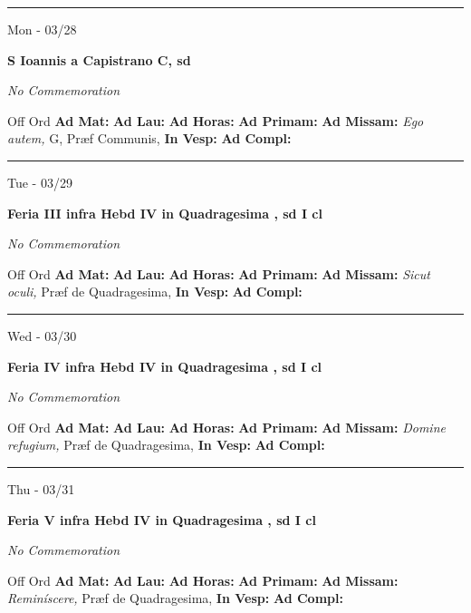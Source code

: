 \documentclass[letterpaper, 10pt]{article}
\begin{document}
\hrule
\begin{center}
Mon - 03/28
\end{center}\textbf{ \large S Ioannis a Capistrano C, \textnormal{\normalsize sd}}

\textit{No Commemoration}\begin{justify}
Off Ord
\textbf{Ad Mat: }
\textbf{Ad Lau: }
\textbf{Ad Horas: }
\textbf{Ad Primam: }
\textbf{Ad Missam:} \textit{Ego autem, } G, Præf Communis, 
\textbf{In Vesp: }
\textbf{Ad Compl: }\end{justify}



\hrule
\begin{center}
Tue - 03/29
\end{center}\textbf{ \large Feria III infra Hebd IV in Quadragesima , \textnormal{\normalsize sd I cl}}

\textit{No Commemoration}\begin{justify}
Off Ord
\textbf{Ad Mat: }
\textbf{Ad Lau: }
\textbf{Ad Horas: }
\textbf{Ad Primam: }
\textbf{Ad Missam:} \textit{Sicut oculi, } Præf de Quadragesima, 
\textbf{In Vesp: }
\textbf{Ad Compl: }\end{justify}



\hrule
\begin{center}
Wed - 03/30
\end{center}\textbf{ \large Feria IV infra Hebd IV in Quadragesima , \textnormal{\normalsize sd I cl}}

\textit{No Commemoration}\begin{justify}
Off Ord
\textbf{Ad Mat: }
\textbf{Ad Lau: }
\textbf{Ad Horas: }
\textbf{Ad Primam: }
\textbf{Ad Missam:} \textit{Domine refugium, } Præf de Quadragesima, 
\textbf{In Vesp: }
\textbf{Ad Compl: }\end{justify}



\hrule
\begin{center}
Thu - 03/31
\end{center}\textbf{ \large Feria V infra Hebd IV in Quadragesima , \textnormal{\normalsize sd I cl}}

\textit{No Commemoration}\begin{justify}
Off Ord
\textbf{Ad Mat: }
\textbf{Ad Lau: }
\textbf{Ad Horas: }
\textbf{Ad Primam: }
\textbf{Ad Missam:} \textit{Reminíscere, } Præf de Quadragesima, 
\textbf{In Vesp: }
\textbf{Ad Compl: }\end{justify}
\end{document}
